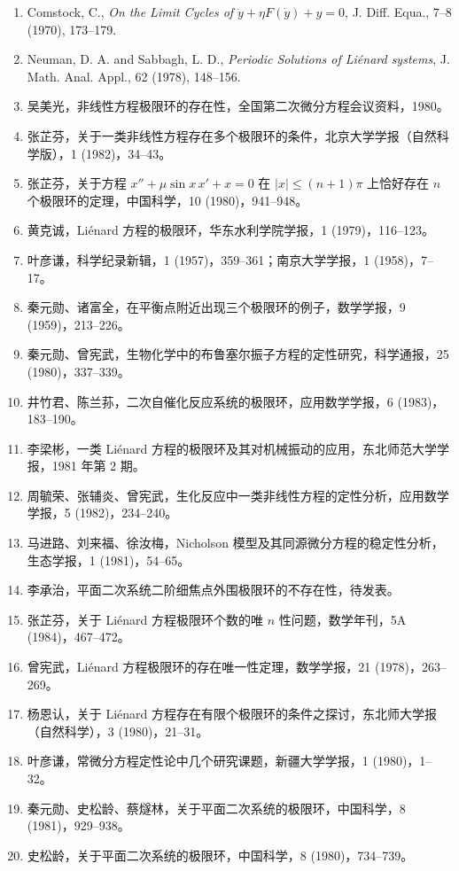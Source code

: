 \begin{enumerate}
\item Comstock, C., \emph{On the Limit Cycles of $\ddot y+\eta F(\dot y)+y=0$}, J. Diff. Equa., 7--8 (1970), 173--179.
\item Neuman, D. A. and Sabbagh, L. D., \emph{Periodic Solutions of Liénard systems}, J. Math. Anal. Appl., 62 (1978), 148--156.
\item 吴美光，非线性方程极限环的存在性，全国第二次微分方程会议资料，1980。
\item 张芷芬，关于一类非线性方程存在多个极限环的条件，北京大学学报（自然科学版），1 (1982)，34--43。
\item 张芷芬，关于方程 $x''+\mu\sin x\,x'+x=0$ 在 $|x|\leqslant(n+1)\pi$ 上恰好存在 $n$ 个极限环的定理，中国科学，10 (1980)，941--948。
\item 黄克诚，Liénard 方程的极限环，华东水利学院学报，1 (1979)，116--123。
\item 叶彦谦，科学纪录新辑，1 (1957)，359--361；南京大学学报，1 (1958)，7--17。
\item 秦元勋、诸富全，在平衡点附近出现三个极限环的例子，数学学报，9 (1959)，213--226。
\item 秦元勋、曾宪武，生物化学中的布鲁塞尔振子方程的定性研究，科学通报，25 (1980)，337--339。
\item 井竹君、陈兰荪，二次自催化反应系统的极限环，应用数学学报，6 (1983)，183--190。
\item 李梁彬，一类 Liénard 方程的极限环及其对机械振动的应用，东北师范大学学报，1981 年第 2 期。
\item 周毓荣、张辅炎、曾宪武，生化反应中一类非线性方程的定性分析，应用数学学报，5 (1982)，234--240。
\item 马进路、刘来福、徐汝梅，Nicholson 模型及其同源微分方程的稳定性分析，生态学报，1 (1981)，54--65。
\item 李承治，平面二次系统二阶细焦点外围极限环的不存在性，待发表。
\item 张芷芬，关于 Liénard 方程极限环个数的唯 $n$ 性问题，数学年刊，5A (1984)，467--472。
\item 曾宪武，Liénard 方程极限环的存在唯一性定理，数学学报，21 (1978)，263--269。
\item 杨恩认，关于 Liénard 方程存在有限个极限环的条件之探讨，东北师大学报（自然科学），3 (1980)，21--31。
\item 叶彦谦，常微分方程定性论中几个研究课题，新疆大学学报，1 (1980)，1--32。
\item 秦元勋、史松龄、蔡燧林，关于平面二次系统的极限环，中国科学，8 (1981)，929--938。
\item 史松龄，关于平面二次系统的极限环，中国科学，8 (1980)，734--739。

\end{enumerate}
